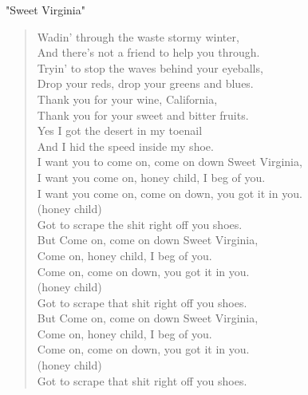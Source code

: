 "Sweet Virginia"
\begin{verse}
Wadin' through the waste stormy winter,\\
And there's not a friend to help you through.\\
Tryin' to stop the waves behind your eyeballs,\\
Drop your reds, drop your greens and blues.\\
Thank you for your wine, California,\\
Thank you for your sweet and bitter fruits.\\
Yes I got the desert in my toenail\\
And I hid the speed inside my shoe.\\
I want you to come on, come on down Sweet Virginia,\\
I want you come on, honey child, I beg of you.\\
I want you come on, come on down, you got it in you.\\
(honey child)\\
Got to scrape the shit right off you shoes.\\
But Come on, come on down Sweet Virginia,\\
Come on, honey child, I beg of you.\\
Come on, come on down, you got it in you.\\
(honey child)\\
Got to scrape that shit right off you shoes.\\
But Come on, come on down Sweet Virginia,\\
Come on, honey child, I beg of you.\\
Come on, come on down, you got it in you.\\
(honey child)\\
Got to scrape that shit right off you shoes.\\
\end{verse}

